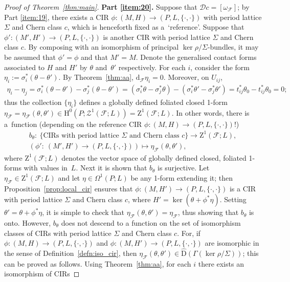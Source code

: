 \documentclass[pdftex]{sigma}
\numberwithin{equation}{section}
\newcommand{\de}{\mathrm{d}} %
\newcommand{\JM}{(P,L,\{\cdot,\cdot\})} %
\newcommand{\CM}{(M,H)} %
\newcommand{\HH}{\mathrm{H}}
\begin{document}
\begin{proof}[Proof of Theorem~\ref{thm:main}]
{\bf Part \ref{item:20}.} Suppose that $\mathcal{D}c = [\omega_{\mathcal{F}}]$; by Part \ref{item:19}, there exists a CIR $\phi \colon \CM \to \JM$ with period lattice $\Sigma$ and Chern class $c$, which is henceforth f\/ixed as a~`reference'. Suppose that $\phi'\colon (M',H') \to \JM$ is another CIR with period lattice $\Sigma$ and Chern class $c$. By composing with an isomorphism of principal $\ker \rho/\Sigma$-bundles, it may be assumed that $\phi' = \phi$ and that $M' = M$. Denote the generalised contact forms associated to $H$ and $H'$ by $\theta$ and~$\theta'$ respectively. For each $i$, consider the form $\eta_i:=\sigma^*_i\left(\theta - \theta'\right)$. By Theorem~\ref{thm:aa}, $\de_{\mathcal{F}} \eta_i = 0$. Moreover, on $U_{ij}$,
 \begin{gather*}
 \eta_i - \eta_j = \sigma^*_i (\theta - \theta' ) - \sigma^*_j(\theta - \theta')= (\sigma^*_i \theta - \sigma^*_j \theta) - (\sigma^*_i \theta' -
 \sigma^*_j \theta') = t_{ij}^* \theta_0 - t_{ij}^* \theta_0 = 0;
\end{gather*}
thus the collection $\{\eta_i\}$ def\/ines a globally def\/ined foliated closed 1-form $\eta_{\mathcal{F}} = \eta_{\mathcal{F}}(\theta,\theta')\in \HH^0(P;\mathcal{Z}^1(\mathcal{F};L)) = \mathrm{Z}^1(\mathcal{F};L)$. In other words, there is a~function (depending on the reference CIR $\phi \colon \CM \to \JM$!)
 \begin{gather*}
 b_{\theta}\colon \ \{ \text{CIRs with period lattice } \Sigma \text{ and Chern class } c\} \to \mathrm{Z}^1(\mathcal{F};L), \nonumber \\
 \left( \phi' \colon \ (M',H') \to \JM\right) \mapsto \eta_{\mathcal{F}}(\theta,\theta'),%
\end{gather*}
where $\mathrm{Z}^1(\mathcal{F};L)$ denotes the vector space of globally def\/ined closed, foliated 1-forms with values in~$L$. Next it is shown that $b_{\theta}$ is surjective. Let $\eta_{\mathcal{F}} \in \mathrm{Z}^1(\mathcal{F};L)$ and let $\eta \in \Omega^1(P;L)$ be any 1-form extending it; then Proposition~\ref{prop:local_cir} ensures that $\phi\colon (M, H') \to \JM$ is a CIR with period lattice $\Sigma$ and Chern class $c$, where $H' = \ker \left(\theta + \phi^*\eta\right)$. Setting $\theta' = \theta + \phi^* \eta$, it is simple to check that $\eta_{\mathcal{F}}(\theta,\theta') = \eta_{\mathcal{F}}$, thus showing that $b_{\theta}$ is onto. However, $b_{\theta}$ does not descend to a function on the set of isomorphism classes of CIRs with period lattice $\Sigma$ and Chern class $c$. For, if $\phi \colon \CM \to \JM$ and $\phi \colon (M,H') \to \JM$ are isomorphic in the sense of Def\/inition~\ref{defn:iso_cir}, then $\eta_{\mathcal{F}}(\theta,\theta') \in \hat{\mathrm{D}}\left(\Gamma\left( \ker \rho/\Sigma\right)\right)$; this can be proved as follows. Using Theorem~\ref{thm:aa}, for each $i$ there exists an isomorphism of CIRs

\end{proof}
\end{document}
